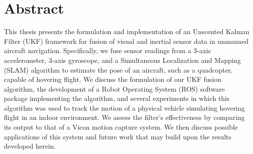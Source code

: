 \chapter*{Abstract}


This thesis presents the formulation and implementation of an Unscented Kalman Filter (UKF) framework for fusion of visual and inertial sensor data in unmanned aircraft navigation. Specifically, we fuse sensor readings from a 3-axis accelerometer, 3-axis gyroscope, and a Simultaneous Localization and Mapping (SLAM) algorithm to estimate the pose of an aircraft, such as a quadcopter, capable of hovering flight. We discuss the formulation of our UKF fusion algorithm, the development of a Robot Operating System (ROS) software package implementing the algorithm, and several experiments in which this algorithm was used to track the motion of a physical vehicle simulating hovering flight in an indoor environment. We assess the filter's effectiveness by comparing its output to that of a Vicon motion capture system. We then discuss possible applications of this system and future work that may build upon the results developed herein.